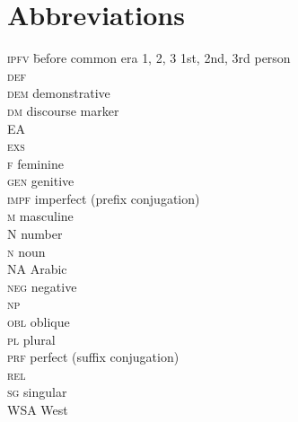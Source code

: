 \documentclass[output=paper]{langsci/langscibook}
\begin{document}
\section*{Abbreviations}
\setlength{\columnsep}{30pt}
\begin{multicols}{2}
\begin{tabbing}
\textsc{ipfv} \hspace{1em} \= before common era\kill
\textsc{1, 2, 3} \> 1st, 2nd, 3rd person \\
\textsc{def} \>   \\
\textsc{dem} \> demonstrative \\
\textsc{dm} \> discourse marker \\
EA \>   \\
\textsc{exs} \>   \\
\textsc{f} \> feminine \\
\textsc{gen} \> genitive \\
\textsc{impf} \> imperfect (prefix conjugation) \\
\textsc{m} \> masculine \\
N \> number \\
\textsc{n} \> noun \\
NA \> { Arabic} \\
\textsc{neg} \> negative \\
\textsc{np} \>  \\
\textsc{obl} \> oblique \\
\textsc{pl} \> plural \\
\textsc{prf} \> perfect (suffix conjugation) \\
\textsc{rel} \>  \\
\textsc{sg} \> singular \\
WSA \> West  
\end{tabbing}
\end{multicols}


\sloppy
\printbibliography[heading=subbibliography,notkeyword=this]
\end{document}
